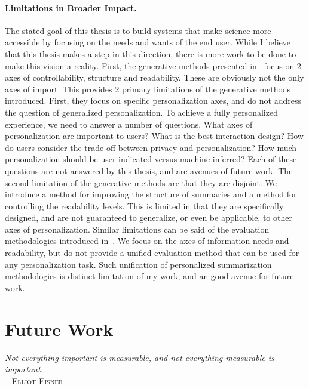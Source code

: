\paragraph{Limitations in Broader Impact.} The stated goal of this thesis is to build systems that make science more accessible by focusing on the needs and wants of the end user. While I believe that this thesis makes a step in this direction, there is more work to be done to make this vision a reality. First, the generative methods presented in~ focus on 2 axes of controllability, structure and readability. These are obviously not the only axes of import. This provides 2 primary limitations of the generative methods introduced. First, they focus on specific personalization axes, and do not address the question of generalized personalization. To achieve a fully personalized experience, we need to answer a number of questions. What axes of personalization are important to users? What is the best interaction design? How do users consider the trade-off between privacy and personalization? How much personalization should be user-indicated versus machine-inferred? Each of these questions are not answered by this thesis, and are avenues of future work. The second limitation of the generative methods are that they are disjoint. We introduce a method for improving the structure of summaries and a method for controlling the readability levels. This is limited in that they are specifically designed, and are not guaranteed to generalize, or even be applicable, to other axes of personalization. Similar limitations can be said of the evaluation methodologies introduced in~. We focus on the axes of information needs and readability, but do not provide a unified evaluation method that can be used for any personalization task. Such unification of personalized summarization methodologies is distinct limitation of my work, and an good avenue for future work.


\section{Future Work}
{
    \small
    \textit{Not everything important is measurable, 
    and not everything measurable is important.} \\
    \textsc{-- Elliot Eisner}
}\\

